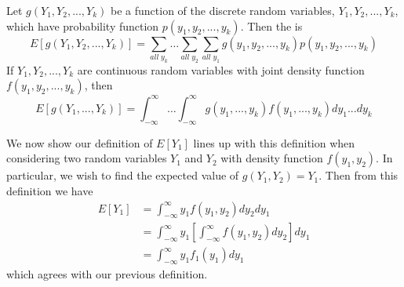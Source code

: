 \documentclass[12pt, a4paper, twoside, openright, titlepage]{book}
\begin{document}
\begin{defn}{}{}
    Let $g(Y_1,Y_2,...,Y_k)$ be a function of the discrete random variables, $Y_1,Y_2,...,Y_k$, which have probability function $p(y_1,y_2,...,y_k)$. Then the  is \begin{equation*}
        E[g(Y_1,Y_2,...,Y_k)] = \sum\limits_{all\;y_k}\hdots \sum\limits_{all\;y_2}\sum\limits_{all\;y_1}g(y_1,y_2,...,y_k)p(y_1,y_2,...,y_k)
    \end{equation*}
    If $Y_1,Y_2,...,Y_k$ are continuous random variables with joint density function $f(y_1,y_2,...,y_k)$, then \begin{equation*}
        E[g(Y_1,...,Y_k)] = \int_{-\infty}^{\infty}\hdots\int_{-\infty}^{\infty}g(y_1,...,y_k)f(y_1,...,y_k)dy_1...dy_k
    \end{equation*}
\end{defn}

\begin{rmk}{}{}
    We now show our definition of $E[Y_1]$ lines up with this definition when considering two random variables $Y_1$ and $Y_2$ with density function $f(y_1,y_2)$. In particular, we wish to find the expected value of $g(Y_1,Y_2) = Y_1$. Then from this definition we have \begin{align*}
        E[Y_1] &= \int_{-\infty}^{\infty}y_1f(y_1,y_2)dy_2dy_1 \\
        &= \int_{-\infty}^{\infty}y_1\left[\int_{-\infty}^{\infty}f(y_1,y_2)dy_2\right]dy_1 \\
        &= \int_{-\infty}^{\infty}y_1f_1(y_1)dy_1
    \end{align*}
    which agrees with our previous definition.
\end{rmk}
\end{document}
